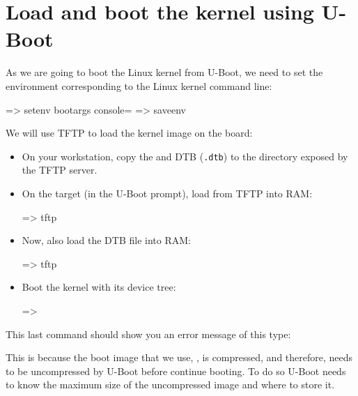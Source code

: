 \section{Load and boot the kernel using U-Boot}

As we are going to boot the Linux kernel from U-Boot,
we need to set the  environment corresponding
to the Linux kernel command line:

\begin{ubootinput}
=> setenv bootargs console=%
=> saveenv
\end{ubootinput}
We will use TFTP to load the kernel image on the board:

\begin{itemize}

\item On your workstation, copy the {\tt {}} and DTB
(\texttt{\dtname}\texttt{.dtb}) to the directory exposed by the TFTP server.

\item On the target (in the U-Boot prompt), load {\tt {}} from
TFTP into RAM:
\begin{ubootinput}
=> tftp %
\end{ubootinput}

\item Now, also load the DTB file into RAM:
\begin{ubootinput}
=> tftp %
\end{ubootinput}

\item Boot the kernel with its device tree:
\begin{ubootinput}
=> %
\end{ubootinput}

\end{itemize}

\if{}
This last command should show you an error message of this type:

This is because the boot image that we use, , is compressed, and
therefore, needs to be uncompressed by U-Boot before continue booting. To do so
U-Boot needs to know the maximum size of the uncompressed image and where to
store it.


